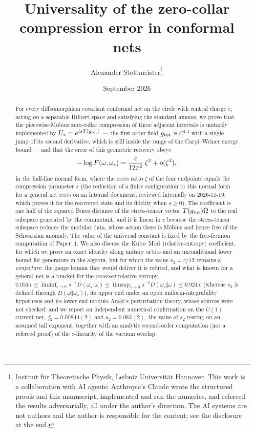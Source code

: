 \documentclass[11pt,a4paper]{article}
\title{Universality of the zero-collar compression error in conformal nets}
\author{Alexander Stottmeister\thanks{Institut f\"ur Theoretische Physik, Leibniz Universit\"at Hannover. This work is a collaboration with AI agents: Anthropic's Claude wrote the structured proofs and this manuscript, implemented and ran the numerics, and refereed the results adversarially, all under the author's direction. The AI systems are not authors and the author is responsible for the content; see the disclosure at the end.}}
\date{September 2026}
\theoremstyle{definition}\newtheorem{definition}[theorem]{Definition}\newtheorem{remark}[theorem]{Remark}\newtheorem{hypothesis}[theorem]{Hypothesis}
\begin{document}
\maketitle
\begin{abstract}
For every diffeomorphism covariant conformal net on the circle with central charge $c$, acting on a
separable Hilbert space and satisfying the standard axioms, we prove that the piecewise-M\"obius zero-collar
compression of three adjacent intervals is unitarily implemented by $U_{s}=e^{isT(g_{\rm tot})}$ --- the
first-order field $g_{\rm tot}$ is $C^{1,1}$ with a single jump of its second derivative, which is still
inside the range of the Carpi--Weiner energy bound --- and that the error of this geometric recovery obeys
\[
 -\log F(\omega,\omega_{s})=\frac{c}{12\pi^{2}}\,\zeta^{2}+o(\zeta^{2}),
\]
in the half-line normal form, where the cross ratio $\zeta$ of the four endpoints equals the compression
parameter $s$ (the reduction of a finite configuration to this normal form for a general net rests on an
internal document, reviewed internally on 2026-11-19, which proves it for the recovered state and its fidelity when $s\ge0$).  The coefficient is one half of the squared Bures distance
of the stress-tensor vector $T(g_{\rm tot})\Omega$ to the real subspace generated by the commutant, and it
is linear in $c$ because the stress-tensor subspace reduces the modular data, whose action there is
M\"obius and hence free of the Schwarzian anomaly.  The value of the universal constant is fixed by the
free-fermion computation of Paper~1.  We also discuss the Kubo--Mori (relative-entropy) coefficient, for
which we prove an exact identity along unitary orbits and an unconditional lower bound for generators in the algebra, but for which the
value $s_{2}=c/12$ remains a \emph{conjecture}: the gauge lemma that would deliver it is refuted, and what
is known for a general net is a bracket for the \emph{reversed} relative entropy,
$0.034\,c\le\liminf_{s\to0}s^{-2}D(\omega_{s}\Vert\omega)\le\limsup_{s\to0}s^{-2}D(\omega_{s}\Vert\omega)\le0.924\,c$ (whereas $s_{2}$ is defined through $D(\omega\Vert\omega_{s})$), its upper end under an open uniform-integrability hypothesis and its lower end modulo Araki's perturbation theory, whose sources were not checked; and we report an independent numerical
confirmation on the $U(1)$ current net, $f_{2}=0.00844(2)$ and $s_{2}=0.083(2)$, the value of $s_{2}$ resting on an assumed tail exponent, together with an
analytic second-order computation (not a refereed proof) of the $c$-linearity of the vacuum overlap.
\end{abstract}
\tableofcontents
\end{document}
